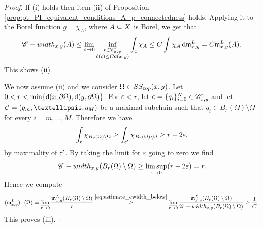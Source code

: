 \documentclass[12pt]{amsart}
\newcommand{\sfd}{{\sf d}}
\renewcommand{\d}{{\mathrm d}}
\newcommand{\limi}{\varliminf}
\newcommand{\X}{{\rm X}}
\newcommand{\mm}{\mathfrak m}
\newcommand{\width}{{\rm width}}
\renewcommand{\SS}{{\rm SS}}
\theoremstyle{definition}
\newcommand{\sfc}{{\sf c}}
\newcommand{\Chain}[1]{\mathscr{C}^{#1}}
\begin{document}
\begin{proof}
    If (i) holds then item (ii) of Proposition \ref{prop:pt_PI_equivalent_conditions_A_p_connectedness} holds. Applying it to the Borel function $g=\chi_A$, where $A\subseteq \X$ is Borel, we get that
    $$\Chain{}\textup{-}\width_{x,y}(A) \le \lim_{\varepsilon \to 0} \inf_{\substack{\sfc \in \Chain{\varepsilon}_{x,y} \\ \ell(\sfc) \le C\sfd(x,y)}} \int_{\sfc} \chi_A \le C\int \chi_A\,\d\mm_{x,y}^L = C\mm_{x,y}^L(A).$$
    This shows (ii).
    
    We now assume (ii) and we consider $\Omega \in \SS_{\rm top}(x,y)$. Let $0< r < \min\{\sfd(x,\partial\Omega), \sfd(y,\partial\Omega)\}$. For $\varepsilon < r$, let $\sfc = \{q_i\}_{i=0}^N \in \Chain{\varepsilon}_{x,y}$ and let  $\sfc' = (q_m,\ldots,q_M)$ be a maximal subchain such that $q_i \in B_r(\Omega)\setminus \Omega$ for every $i=m,\ldots,M$. Therefore we have
    $$\int_{\sfc}\chi_{B_r(\Omega)\setminus \Omega} \geq \int_{\sfc'}\chi_{B_r(\Omega)\setminus \Omega} \geq r-2\varepsilon,$$
    by maximality of $\sfc'$. By taking the limit for $\varepsilon$ going to zero we find
    \begin{equation}
        \label{eq:estimate_cwidth_below}
        \Chain{}\textup{-}\width_{x,y}(B_r(\Omega)\setminus \Omega) \geq \limsup_{\varepsilon \to 0} (r - 2\varepsilon) = r.
    \end{equation}
    Hence we compute
    $$(\mm_{x,y}^L)^+(\Omega) = \limi_{r \to 0}\frac{\mm_{x,y}^L(B_r(\Omega)\setminus \Omega)}{r} \stackrel{\eqref{eq:estimate_cwidth_below}}{\geq} \limi_{r \to 0}\frac{\mm_{x,y}^L(B_r(\Omega)\setminus \Omega)}{\Chain{}\textup{-}\width_{x,y}(B_r(\Omega)\setminus \Omega)} \geq \frac{1}{C}.$$
This proves (iii). 


\end{proof}
\end{document}
